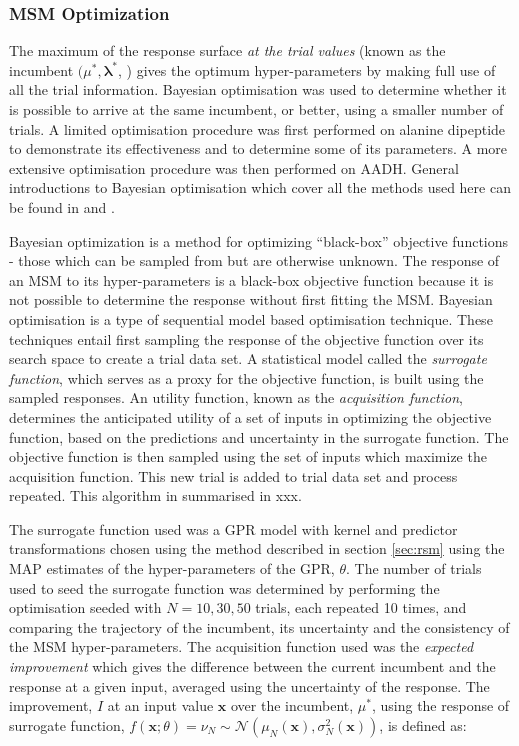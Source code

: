 \subsubsection{MSM Optimization}\label{sec:meth_opt}
The maximum of the response surface \emph{at the trial values} (known as the incumbent $(\mu^{*}, \mathbf{\lambda}^{*}$, \cite{shahriariTakingHumanOut}) gives the optimum hyper-parameters  by making full use of all the trial information. Bayesian optimisation was used to determine whether it is possible to arrive at the same incumbent, or better, using a smaller number of trials. A limited optimisation procedure was first performed on alanine dipeptide to demonstrate its effectiveness and to determine some of its parameters. A more extensive optimisation procedure was then performed on AADH. General introductions to Bayesian optimisation which cover all the methods used here can be found in \cite{snoekPracticalBayesianOptimization} and \cite{shahriariTakingHumanOut}. 

Bayesian optimization is a method for optimizing ``black-box'' objective functions - those which can be sampled from but are otherwise unknown. The response of an MSM to its hyper-parameters is a black-box objective function because it is not possible to determine the response without first fitting the MSM. Bayesian optimisation is a type of sequential model based \cite{hutterSequentialModelbasedOptimization2011} optimisation technique. These techniques entail first sampling the response of the objective function over its search space to create a trial data set. A statistical model called the \emph{surrogate function}, which serves as a proxy for the objective function, is built using the sampled responses. An utility function, known as the \emph{acquisition function}, determines the anticipated utility of a set of inputs in optimizing the objective function, based on the predictions and uncertainty in the surrogate function.  The objective function is then sampled using the set of inputs which maximize the acquisition function. This new trial is added to trial data set and process repeated. This algorithm in summarised in xxx. 

The surrogate function used was a GPR model with kernel and predictor transformations chosen using the method described in section \ref{sec:rsm} using the MAP estimates of the hyper-parameters of the GPR, $\theta$. The number of trials used to seed the surrogate function was determined by performing the optimisation seeded with $N=10, 30, 50$ trials, each repeated 10 times, and comparing the trajectory of the incumbent, its uncertainty and the consistency of the MSM hyper-parameters. The acquisition function used was the \emph{expected improvement} which gives the difference between the current incumbent and the  response at a given input, averaged using the uncertainty of the response. The improvement, $I$ at an input value $\mathbf{x}$ over the incumbent, $\mu^{*}$, using the response of surrogate function, $f(\mathbf{x}; \theta) = \nu_{N} \sim \mathcal{N}(\mu_{N}(\mathbf{x}), \sigma_N^{2}(\mathbf{x}))$, is defined as: 

